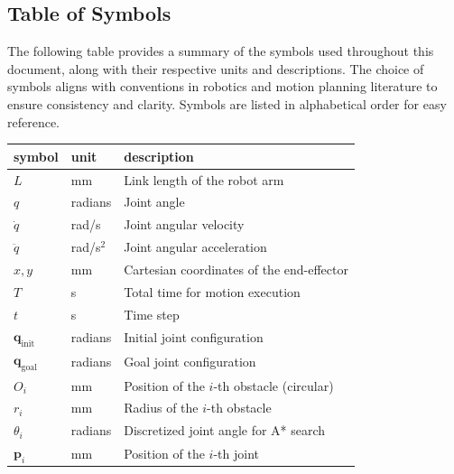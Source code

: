 \documentclass[12pt]{article}
\begin{document}
\subsection{Table of Symbols}

The following table provides a summary of the symbols used throughout this document, along with their respective units and descriptions. The choice of symbols aligns with conventions in robotics and motion planning literature to ensure consistency and clarity. Symbols are listed in alphabetical order for easy reference.

\renewcommand{\arraystretch}{1.2}
\noindent \begin{longtable*}{l l p{12cm}} \toprule
\textbf{symbol} & \textbf{unit} & \textbf{description}\\
\midrule 
\( L \) & \si{\milli\metre} & Link length of the robot arm \\
\( q \) & radians & Joint angle \\
\( \dot{q} \) & rad/s & Joint angular velocity \\
\( \ddot{q} \) & rad/s\(^2\)  & Joint angular acceleration \\
\( x, y \) & \si{\milli\metre} & Cartesian coordinates of the end-effector \\
\( T \) & \si{\second} & Total time for motion execution \\
\( t \) & \si{\second} & Time step \\
\( \mathbf{q}_{\text{init}} \) & radians & Initial joint configuration \\
\( \mathbf{q}_{\text{goal}} \) & radians & Goal joint configuration \\
\( O_i \) & \si{\milli\metre} & Position of the \(i\)-th obstacle (circular) \\
\( r_i \) & \si{\milli\metre} & Radius of the \(i\)-th obstacle \\
\( \theta_i \) & radians & Discretized joint angle for A* search \\
\( \mathbf{p}_i \) & \si{\milli\metre} & Position of the \(i\)-th joint \\

\bottomrule
\end{longtable*}
\end{document}
